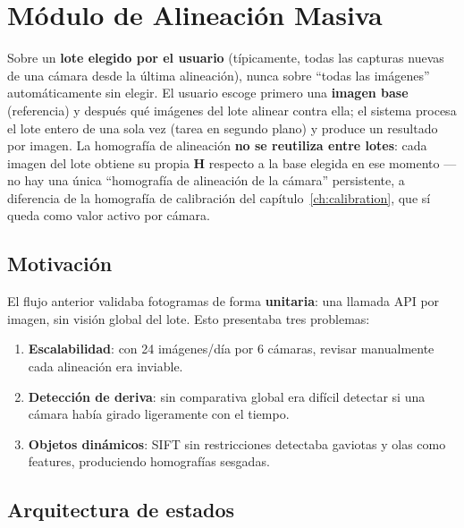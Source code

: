 \chapter{Módulo de Alineación Masiva}
\label{ch:batch}

\begin{infobox}
Sobre un \textbf{lote elegido por el usuario} (típicamente, todas las capturas nuevas de una
cámara desde la última alineación), nunca sobre ``todas las imágenes'' automáticamente sin
elegir. El usuario escoge primero una \textbf{imagen base} (referencia) y después qué imágenes
del lote alinear contra ella; el sistema procesa el lote entero de una sola vez (tarea en
segundo plano) y produce un resultado por imagen. La homografía de alineación
\textbf{no se reutiliza entre lotes}: cada imagen del lote obtiene su propia $\mathbf{H}$
respecto a la base elegida en ese momento — no hay una única ``homografía de alineación de la
cámara'' persistente, a diferencia de la homografía de calibración del
capítulo~\ref{ch:calibration}, que sí queda como valor activo por cámara.
\end{infobox}

\section{Motivación}

El flujo anterior validaba fotogramas de forma \textbf{unitaria}: una llamada API por imagen,
sin visión global del lote. Esto presentaba tres problemas:

\begin{enumerate}[leftmargin=1.5em]
  \item \textbf{Escalabilidad}: con 24 imágenes/día por 6 cámaras, revisar manualmente cada
        alineación era inviable.
  \item \textbf{Detección de deriva}: sin comparativa global era difícil detectar si una
        cámara había girado ligeramente con el tiempo.
  \item \textbf{Objetos dinámicos}: SIFT sin restricciones detectaba gaviotas y olas como
        features, produciendo homografías sesgadas.
\end{enumerate}

\section{Arquitectura de estados}

